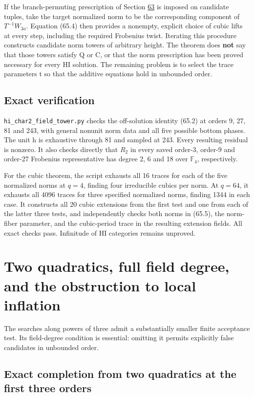 \documentclass[11pt,reqno]{amsart}
\theoremstyle{plain}
\begin{document}
If the branch-permuting prescription of Section \hyperref[sec:63]{63} is imposed on
candidate tuples, take the target normalized norm to be the
corresponding component of \(T^{-1}W_{3a}\). Equation (65.4)
then provides a nonempty, explicit choice of cubic lifts at every
step, including the required Frobenius twist. Iterating this procedure
constructs candidate norm towers of arbitrary height. The theorem
does \textbf{not} say that those towers satisfy Q or C, or that the norm
prescription has been proved necessary for every HI solution.
The remaining problem is to select the trace parameters t so that
the additive equations hold in unbounded order.

\subsection{Exact verification}\label{sec:65.4}

\texttt{hi\_\allowbreak char2\_\allowbreak field\_\allowbreak tower.py} checks the off-solution identity (65.2)
at orders 9, 27, 81 and 243, with general nonunit norm data and all
five possible bottom phases. The unit h is exhaustive through 81
and sampled at 243. Every resulting residual is nonzero. It also
checks directly that \(R_2\) in every saved order-3, order-9 and
order-27 Frobenius representative has degree 2, 6 and 18 over
\(\mathbb F_4\), respectively.

For the cubic theorem, the script exhausts all 16 traces for each
of the five normalized norms at \(q=4\), finding four irreducible
cubics per norm. At \(q=64\), it exhausts all 4096 traces for
three specified normalized norms, finding 1344 in each case. It
constructs all 20 cubic extensions from the first test and one from
each of the latter three tests, and independently checks both norms
in (65.5), the norm-fiber parameter, and the cubic-period trace in
the resulting extension fields. All exact checks pass.
Infinitude of HI categories remains unproved.

\section{Two quadratics, full field degree, and the obstruction to local inflation}\label{sec:66}

The searches along powers of three admit a substantially smaller finite
acceptance test. Its field-degree condition is essential: omitting it
permits explicitly false candidates in unbounded order.

\subsection{Exact completion from two quadratics at the first three orders}\label{sec:66.1}
\end{document}
